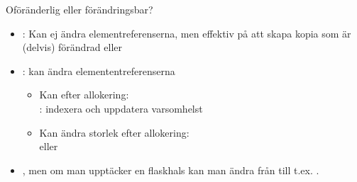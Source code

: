\begin{Slide}{Oföränderlig eller förändringsbar?}
\begin{itemize}
\item {}:  Kan ej ändra elementreferenserna, men effektiv på att skapa kopia som är (delvis) förändrad  eller 

\item {}: kan ändra elemententreferenserna
  \begin{itemize}
  \item Kan  efter allokering: \\ : indexera och uppdatera varsomhelst
  \item Kan ändra storlek efter allokering:
  \\ eller 
  \end{itemize}
\item {}, men om man  upptäcker en flaskhals kan man ändra från  till t.ex. .
\end{itemize}
\end{Slide}






